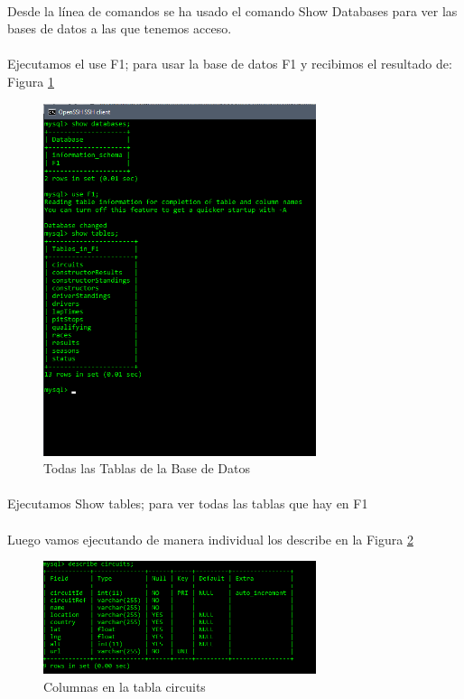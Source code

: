 \documentclass[%
,twoside
]{article}
\begin{document}
\paragraph{}
Desde la línea de comandos se ha usado el comando Show Databases para ver las bases de datos a las que tenemos acceso.

\paragraph{}
Ejecutamos el use F1; para usar la base de datos F1 y recibimos el resultado de: Figura \ref{tablas}

\begin{figure}[H]
  \centering
  \label{tablas}
  \includegraphics[width=8cm]{tables.png}  
  \caption{Todas las Tablas de la Base de Datos}

\end{figure}


\paragraph{}
Ejecutamos Show tables; para ver todas las tablas que hay en F1

\paragraph{}
Luego vamos ejecutando de manera individual los describe en la Figura \ref{table_columns}

\begin{figure}[H]
  \centering
  \label{table_columns}
  \includegraphics[width=8cm]{table_columns.png}
  \caption{Columnas en la tabla circuits}
\end{figure}
\end{document}
